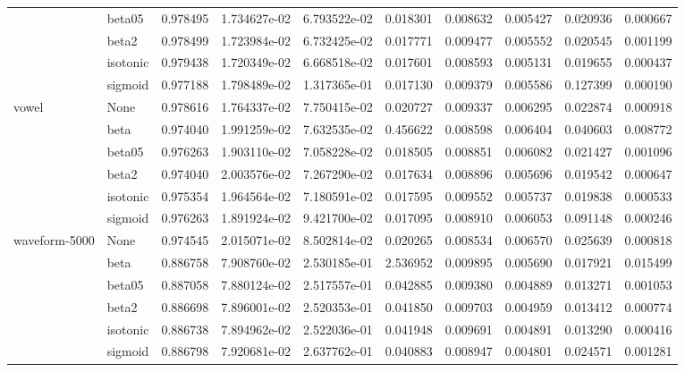 \begin{tabular}{llrrrrrrrr}
        & beta05 &  0.978495 &  1.734627e-02 &  6.793522e-02 &   0.018301 &  0.008632 &  0.005427 &  0.020936 &  0.000667 \\
        & beta2 &  0.978499 &  1.723984e-02 &  6.732425e-02 &   0.017771 &  0.009477 &  0.005552 &  0.020545 &  0.001199 \\
        & isotonic &  0.979438 &  1.720349e-02 &  6.668518e-02 &   0.017601 &  0.008593 &  0.005131 &  0.019655 &  0.000437 \\
        & sigmoid &  0.977188 &  1.798489e-02 &  1.317365e-01 &   0.017130 &  0.009379 &  0.005586 &  0.127399 &  0.000190 \\
vowel & None &  0.978616 &  1.764337e-02 &  7.750415e-02 &   0.020727 &  0.009337 &  0.006295 &  0.022874 &  0.000918 \\
        & beta &  0.974040 &  1.991259e-02 &  7.632535e-02 &   0.456622 &  0.008598 &  0.006404 &  0.040603 &  0.008772 \\
        & beta05 &  0.976263 &  1.903110e-02 &  7.058228e-02 &   0.018505 &  0.008851 &  0.006082 &  0.021427 &  0.001096 \\
        & beta2 &  0.974040 &  2.003576e-02 &  7.267290e-02 &   0.017634 &  0.008896 &  0.005696 &  0.019542 &  0.000647 \\
        & isotonic &  0.975354 &  1.964564e-02 &  7.180591e-02 &   0.017595 &  0.009552 &  0.005737 &  0.019838 &  0.000533 \\
        & sigmoid &  0.976263 &  1.891924e-02 &  9.421700e-02 &   0.017095 &  0.008910 &  0.006053 &  0.091148 &  0.000246 \\
waveform-5000 & None &  0.974545 &  2.015071e-02 &  8.502814e-02 &   0.020265 &  0.008534 &  0.006570 &  0.025639 &  0.000818 \\
        & beta &  0.886758 &  7.908760e-02 &  2.530185e-01 &   2.536952 &  0.009895 &  0.005690 &  0.017921 &  0.015499 \\
        & beta05 &  0.887058 &  7.880124e-02 &  2.517557e-01 &   0.042885 &  0.009380 &  0.004889 &  0.013271 &  0.001053 \\
        & beta2 &  0.886698 &  7.896001e-02 &  2.520353e-01 &   0.041850 &  0.009703 &  0.004959 &  0.013412 &  0.000774 \\
        & isotonic &  0.886738 &  7.894962e-02 &  2.522036e-01 &   0.041948 &  0.009691 &  0.004891 &  0.013290 &  0.000416 \\
        & sigmoid &  0.886798 &  7.920681e-02 &  2.637762e-01 &   0.040883 &  0.008947 &  0.004801 &  0.024571 &  0.001281 \\

\end{tabular}
